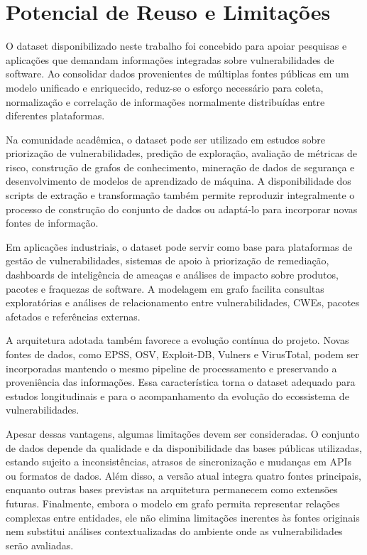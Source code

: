 \section{Potencial de Reuso e Limitações}

O dataset disponibilizado neste trabalho foi concebido para apoiar pesquisas e aplicações que demandam informações integradas sobre vulnerabilidades de software. Ao consolidar dados provenientes de múltiplas fontes públicas em um modelo unificado e enriquecido, reduz-se o esforço necessário para coleta, normalização e correlação de informações normalmente distribuídas entre diferentes plataformas.

Na comunidade acadêmica, o dataset pode ser utilizado em estudos sobre priorização de vulnerabilidades, predição de exploração, avaliação de métricas de risco, construção de grafos de conhecimento, mineração de dados de segurança e desenvolvimento de modelos de aprendizado de máquina. A disponibilidade dos scripts de extração e transformação também permite reproduzir integralmente o processo de construção do conjunto de dados ou adaptá-lo para incorporar novas fontes de informação.

Em aplicações industriais, o dataset pode servir como base para plataformas de gestão de vulnerabilidades, sistemas de apoio à priorização de remediação, dashboards de inteligência de ameaças e análises de impacto sobre produtos, pacotes e fraquezas de software. A modelagem em grafo facilita consultas exploratórias e análises de relacionamento entre vulnerabilidades, CWEs, pacotes afetados e referências externas.

A arquitetura adotada também favorece a evolução contínua do projeto. Novas fontes de dados, como EPSS, OSV, Exploit-DB, Vulners e VirusTotal, podem ser incorporadas mantendo o mesmo pipeline de processamento e preservando a proveniência das informações. Essa característica torna o dataset adequado para estudos longitudinais e para o acompanhamento da evolução do ecossistema de vulnerabilidades.

Apesar dessas vantagens, algumas limitações devem ser consideradas. O conjunto de dados depende da qualidade e da disponibilidade das bases públicas utilizadas, estando sujeito a inconsistências, atrasos de sincronização e mudanças em APIs ou formatos de dados. Além disso, a versão atual integra quatro fontes principais, enquanto outras bases previstas na arquitetura permanecem como extensões futuras. Finalmente, embora o modelo em grafo permita representar relações complexas entre entidades, ele não elimina limitações inerentes às fontes originais nem substitui análises contextualizadas do ambiente onde as vulnerabilidades serão avaliadas.
